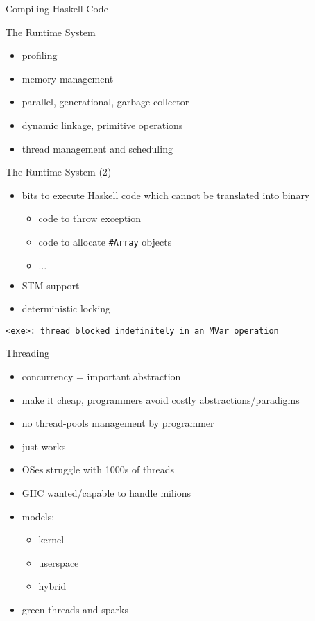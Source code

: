\documentclass{beamer}
\begin{document}
\begin{frame}{Compiling Haskell Code}
  \centering
\end{frame}

\begin{frame}{The Runtime System}
  \begin{itemize}
    \item profiling
    \item memory management
    \item parallel, generational, garbage collector
    \item dynamic linkage, primitive operations
    \item thread management and scheduling
  \end{itemize}
  \centering
\end{frame}

\begin{frame}{The Runtime System (2)}
  \begin{itemize}
    \item bits to execute Haskell code which cannot be translated into binary
    \begin{itemize}
      \item code to throw exception
      \item code to allocate \texttt{\#Array} objects
      \item $\ldots$
    \end{itemize}
    \item STM support
    \item deterministic locking
  \end{itemize}
  \texttt{<exe>: thread blocked indefinitely in an MVar operation}
\end{frame}

\begin{frame}{Threading}
  \begin{itemize}
    \item concurrency = important abstraction
    \item make it cheap, programmers avoid costly abstractions/paradigms
    \item no thread-pools management by programmer
    \item just works
    \pause
    \item OSes struggle with 1000s of threads
    \item GHC wanted/capable to handle milions
    \pause
    \item models:
    \begin{itemize}
      \item kernel
      \item userspace
      \item hybrid
    \end{itemize}
    \pause
    \item green-threads and sparks
  \end{itemize}
\end{frame}
\end{document}
